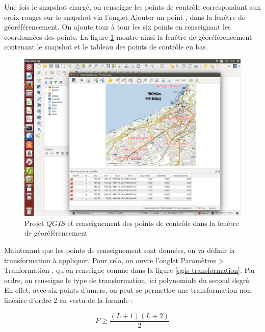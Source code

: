 \documentclass{book}
\begin{document}
\clearpage

Une fois le snapshot chargé, on renseigne les points de contr\^{o}le correspondant aux croix rouges sur le snapshot via l'onglet 
\og Ajouter un point \fg{}, dans la fenêtre de géoréférencement. On ajoute tour à tour les six points en renseignant
les coordonnées des points. La figure \ref{qgis-points} montre ainsi la fen\^{e}tre de géoréférencement contenant le snapshot 
et le tableau des points de contr\^{o}le en bas.

\begin{figure}[H]
\begin{center}
\includegraphics[scale=0.3]{images/qgis-points.png}
\end{center}
\caption{Projet $QGIS$ et renseignement des points de contr\^{o}le dans la fen\^{e}tre de géoréférencement}
\label{qgis-points}
\end{figure}

\clearpage

Maintenant que les points de renseignement sont données, on va définir la transformation à appliquer. Pour cela, on ouvre l'onglet
 \og Paramètres > Tranformation \fg{}, qu'on renseigne comme dans la figure \ref{qgis-transformation}. Par ordre, 
on renseigne le type de transformation, ici polynomiale du second degré. En effet, avec six points d'amers, on peut se permettre
une transformation non linéaire d'ordre 2 en vertu de la formule \cite{Nicolas:2014}:

\[P\ge\frac{(L+1)(L+2)}{2}\]
\end{document}
